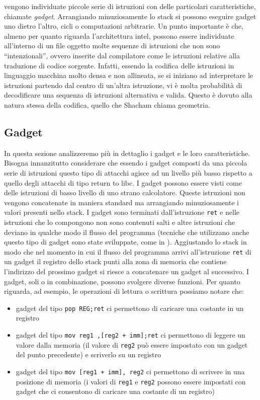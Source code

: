 vengono individuate piccole serie di istruzioni con delle particolari
caratteristiche, chiamate \emph{gadget}. Arrangiando minuziosamente lo
stack si possono eseguire gadget uno dietro l'altro, cicli o
computazioni arbitrarie. Un punto importante è che, almeno per quanto
riguarda l'architettura intel, possono essere individuate all'interno
di un file oggetto molte sequenze di istruzioni che non sono
``intenzionali'', ovvero inserite dal compilatore come le istruzioni
relative alla traduzione di codice sorgente. Infatti, essendo la
codifica delle istruzioni in linguaggio macchina molto densa e non
allineata, se si iniziano ad interpretare le istruzioni partendo dal
centro di un'altra istruzione, vi è molta probabilità di decodificare
una sequenza di istruzioni alternativa e valida. Questo è dovuto alla
natura stessa della codifica, quello che Shacham chiama geometria.

\subsection{Gadget}

In questa sezione analizzeremo più in dettaglio i gadget e le loro
caratteristiche. Bisogna innanzitutto considerare che essendo i gadget
composti da una piccola serie di istruzioni questo tipo di attacchi
agisce ad un livello più basso rispetto a quello degli attacchi di
tipo return to libc. I gadget possono essere visti come delle
istruzioni di basso livello di uno strano calcolatore. Queste
istruzioni non vengono concatenate in maniera standard ma arrangiando
minuziosamente i valori presenti nello stack. I gadget sono terminati
dall'istruzione \lstinline{ret} e nelle istruzioni che lo compongono
non sono contenuti salti e altre istruzioni che deviano in qualche
modo il flusso del programma (tecniche che utilizzano anche questo
tipo di gadget sono state sviluppate, come in
\cite{Checkoway-10}). Aggiustando lo stack in modo che nel momento in
cui il flusso del programma arrivi all'istruzione \lstinline{ret} di
un gadget il registro dello stack punti alla zona di memoria che
contiene l'indirizzo del prossimo gadget si riesce a concatenare un
gadget al successivo. I gadget, soli o in combinazione, possono
svolgere diverse funzioni. Per quanto riguarda, ad esempio, le
operazioni di lettura o scrittura possiamo notare che:

\begin{itemize}
\item gadget del tipo \lstinline{pop REG;ret} ci permettono di
caricare una costante in un registro

\item gadget del tipo \lstinline{mov reg1 ,[reg2 + imm];ret} ci
  permettono di leggere un valore dalla memoria (il valore di
  \lstinline{reg2} può essere impostato con un gadget del punto
  precedente) e scriverlo su un registro

\item gadget del tipo \lstinline{mov [reg1 + imm], reg2} ci permettono
  di scrivere in una posizione di memoria (i valori di
  \lstinline{reg1} e \lstinline{reg2} possono essere impostati con
  gadget che ci consentono di caricare una costante di un registro)
\end{itemize}

